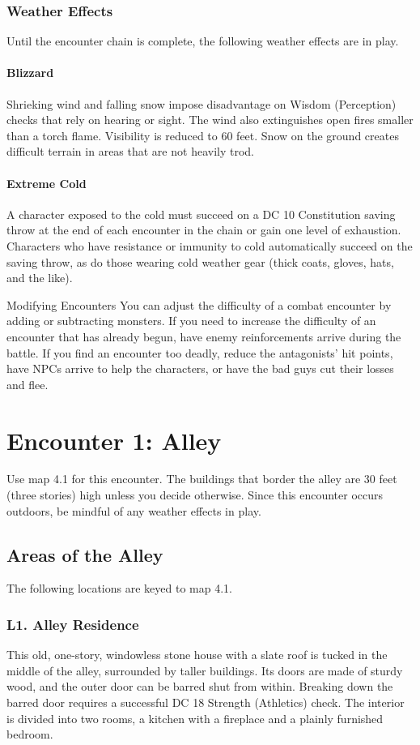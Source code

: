 \documentclass[10pt,a4paper,twoside,twocolumn,openany,nodeprecatedcode]{dndbook}
\begin{document}
\subsubsection{Weather Effects}
Until the encounter chain is complete, the following weather effects are in play.
\paragraph{Blizzard}
Shrieking wind and falling snow impose disadvantage on Wisdom (Perception) checks that rely on hearing or sight. The wind also extinguishes open fires smaller than a torch flame. Visibility is reduced to 60 feet. Snow on the ground creates difficult terrain in areas that are not heavily trod.
\paragraph{Extreme Cold}
A character exposed to the cold must succeed on a DC 10 Constitution saving throw at the end of each encounter in the chain or gain one level of exhaustion. Characters who have resistance or immunity to cold automatically succeed on the saving throw, as do those wearing cold weather gear (thick coats, gloves, hats, and the like).
\begin{DndComment}{Modifying Encounters}
You can adjust the difficulty of a combat encounter by adding or subtracting monsters. If you need to increase the difficulty of an encounter that has already begun, have enemy reinforcements arrive during the battle. If you find an encounter too deadly, reduce the antagonists' hit points, have NPCs arrive to help the characters, or have the bad guys cut their losses and flee.
\end{DndComment}

\section{Encounter 1: Alley}
Use map 4.1 for this encounter. The buildings that border the alley are 30 feet (three stories) high unless you decide otherwise. Since this encounter occurs outdoors, be mindful of any weather effects in play.
\subsection{Areas of the Alley}
The following locations are keyed to map 4.1.
\subsubsection{L1. Alley Residence}
This old, one-story, windowless stone house with a slate roof is tucked in the middle of the alley, surrounded by taller buildings. Its doors are made of sturdy wood, and the outer door can be barred shut from within. Breaking down the barred door requires a successful DC 18 Strength (Athletics) check.
The interior is divided into two rooms, a kitchen with a fireplace and a plainly furnished bedroom.
\end{document}
